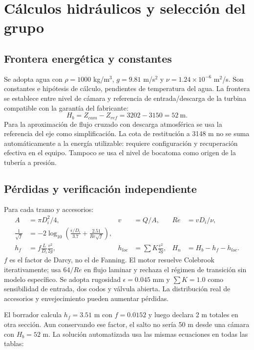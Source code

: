 \chapter{Cálculos hidráulicos y selección del grupo}
\section{Frontera energética y constantes}
Se adopta agua con $\rho=1000$ kg/m$^3$, $g=9.81$ m/s$^2$ y $\nu=1.24\times10^{-6}$ m$^2$/s. Son constantes e hipótesis de cálculo, pendientes de temperatura del agua. La frontera se establece entre nivel de cámara y referencia de entrada/descarga de la turbina compatible con la garantía del fabricante:
\begin{equation}
H_b=Z_{cam}-Z_{ref}=3202-3150=52\ \mathrm{m}.
\end{equation}
Para la aproximación de flujo cruzado con descarga atmosférica se usa la referencia del eje como simplificación. La cota de restitución a 3148 m no se suma automáticamente a la energía utilizable: requiere configuración y recuperación efectiva en el equipo. Tampoco se usa el nivel de bocatoma como origen de la tubería a presión.

\section{Pérdidas y verificación independiente}
Para cada tramo y accesorios:
\begin{align}
A&=\pi D_i^2/4, & v&=Q/A, & Re&=vD_i/\nu,\\
\frac{1}{\sqrt f}&=-2\log_{10}\left(\frac{\epsilon/D_i}{3.7}+\frac{2.51}{Re\sqrt f}\right),\\
h_f&=f\frac{L}{D_i}\frac{v^2}{2g}, & h_{loc}&=\sum K\frac{v^2}{2g}, & H_n&=H_b-h_f-h_{loc}.
\end{align}
$f$ es el factor de Darcy, no el de Fanning. El motor resuelve Colebrook iterativamente; usa $64/Re$ en flujo laminar y rechaza el régimen de transición sin modelo específico. Se adopta rugosidad $\epsilon=0.045$ mm y $\sum K=1.0$ como sensibilidad de entrada, dos codos y válvula abierta. La distribución real de accesorios y envejecimiento pueden aumentar pérdidas.

El borrador calcula $h_f=3.51$ m con $f=0.0152$ y luego declara 2 m totales en otra sección. Aun conservando ese factor, el salto no sería 50 m desde una cámara con $H_b=52$ m. La solución automatizada usa las mismas ecuaciones en todas las tablas:
\small\normalsize
{}

